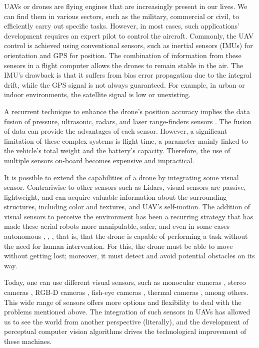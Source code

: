UAVs or drones are flying engines that are increasingly present in our lives. We can find them in various sectors, such as the military, commercial or civil, to efficiently carry out specific tasks. However, in most cases, such applications' development requires an expert pilot to control the aircraft. Commonly, the UAV control is achieved using conventional sensors, such as inertial sensors (IMUs) for orientation and GPS for position. The combination of information from these sensors in a flight computer allows the drones to remain stable in the air. The IMU's drawback is that it suffers from bias error propagation due to the integral drift, while the GPS signal is not always guaranteed. For example, in urban or indoor environments, the satellite signal is low or unexisting.

A recurrent technique to enhance the drone's position accuracy implies the data fusion of pressure, ultrasonic, radars, and laser range-finders sensors \citep{Tomic.Schmid.ea:IRAM:2012}. The fusion of data can provide the advantages of each sensor. However, a significant limitation of these complex systems is flight time, a parameter mainly linked to the vehicle's total weight and the battery's capacity. Therefore, the use of multiple sensors on-board becomes expensive and impractical.

It is possible to extend the capabilities of a drone by integrating some visual sensor. Contrariwise to other sensors such as Lidars, visual sensors are passive, lightweight, and can acquire valuable information about the surrounding structures, including color and textures, and UAV's self-motion. The addition of visual sensors to perceive the environment has been a recurring strategy that has made these aerial robots more manipulable, safer, and even in some cases autonomous \citep{He.Qiao.ea:CM:2018}, \citep{Kyrkou.Timotheou.ea:POT:2019}, \citep{Zhu.Wen.ea:arXiv:2020}, that is, that the drone is capable of performing a task without the need for human intervention. For this, the drone must be able to move without getting lost; moreover, it must detect and avoid potential obstacles on its way. 

Today, one can use different visual sensors, such as monocular cameras \citep{Padhy.Xia.ea:TSC:2018}, stereo cameras \citep{Seitz.Curless.ea:CVPR:2006}, RGB-D cameras \citep{Huang.Bachrach.ea:RobR:2017}, fish-eye cameras \citep{Hrabar.Sukhatme:IROS:2004}, thermal cameras \citep{Gaszczak.Breckon.ea:IRCV:2011}, among others. This wide range of sensors offers more options and flexibility to deal with the problems mentioned above. The integration of such sensors in UAVs has allowed us to see the world from another perspective (literally), and the development of perceptual computer vision algorithms drives the technological improvement of these machines.

